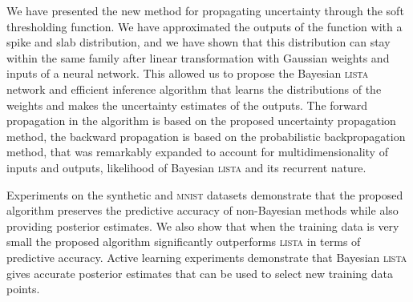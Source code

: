\documentclass{article}
\begin{document}
  We have presented the new method for propagating uncertainty through the soft thresholding function. %
  We have approximated the outputs of the function with a spike and slab distribution, and we have shown that this distribution can stay within the same family after linear transformation with Gaussian weights and inputs of a neural network. This allowed us to propose the Bayesian \textsc{lista} network and efficient inference algorithm that learns the distributions of the weights and makes the uncertainty estimates of the outputs. The forward propagation in the algorithm is based on the proposed uncertainty propagation method, the backward propagation is based on the probabilistic backpropagation method, that was remarkably expanded to account for multidimensionality of inputs and outputs, likelihood of Bayesian \textsc{lista} and its recurrent nature.
  
  Experiments on the synthetic and \textsc{mnist} datasets demonstrate that the proposed algorithm preserves the predictive accuracy of non-Bayesian methods while also providing posterior estimates. We also show that when the training data is very small the proposed algorithm significantly outperforms \textsc{lista} in terms of predictive accuracy. Active learning experiments demonstrate that Bayesian \textsc{lista} gives accurate posterior estimates that can be used to select new training data points.
  



\end{document}
